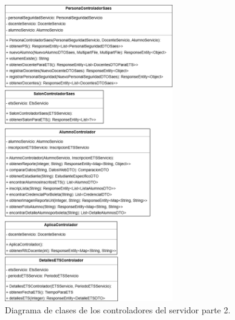 \begin{figure}[htbp!]
	\begin{center}
		\includegraphics[width=0.65\textwidth]{Clases/Controlador2.png}
		\caption{Diagrama de clases de los controladores del servidor parte 2.}
		\label{fig:DC2}
	\end{center}
\end{figure}

